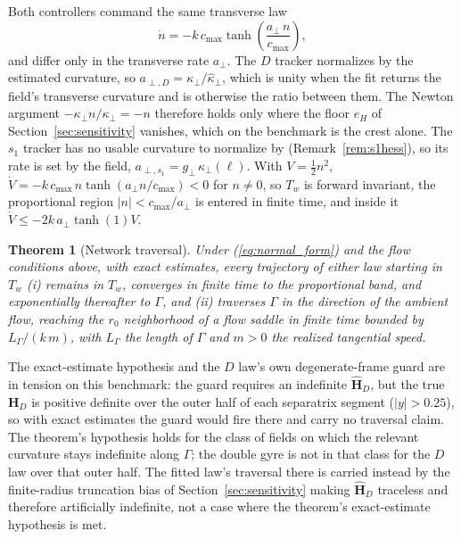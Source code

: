 \documentclass[lettersize,journal]{IEEEtran}
\newtheorem{theorem}{Theorem}
\begin{document}
Both controllers command the same transverse law
\begin{equation}
    \dot{n} = -k\,c_{\max}\tanh\!\left(
        \frac{a_\perp\,n}{c_{\max}}\right),
    \label{eq:n_dynamics}
\end{equation}
and differ only in the transverse rate $a_\perp$. The $D$ tracker
normalizes by the estimated curvature, so $a_{\perp,D} = \kappa_\perp /
\hat{\kappa}_\perp$, which is unity when the fit returns the field's
transverse curvature and is otherwise the ratio between them. The
Newton argument $-\kappa_\perp n/\kappa_\perp = -n$ therefore holds only
where the floor $e_H$ of Section~\ref{sec:sensitivity} vanishes, which on
the benchmark is the crest alone. The $s_1$ tracker has no usable curvature to normalize by
(Remark~\ref{rem:s1hess}), so its rate is set by the field,
$a_{\perp,s_1} = g_\perp\,\kappa_\perp(\ell)$.
With $V = \tfrac{1}{2}n^2$, $\dot{V} = -k\,c_{\max}\,n\tanh(a_\perp
n/c_{\max}) < 0$ for $n \neq 0$, so $T_w$ is forward invariant, the
proportional region $|n| < c_{\max}/a_\perp$ is entered in finite time,
and inside it $\dot{V} \leq -2k\,a_\perp\tanh(1)V$.

\begin{theorem}[Network traversal]
\label{thm:separatrix}
Under (\ref{eq:normal_form}) and the flow conditions above, with exact
estimates, every
trajectory of either law starting in $T_w$ (i) remains in $T_w$, converges
in finite time to the proportional band, and exponentially thereafter to $\Gamma$, and (ii) traverses $\Gamma$ in the direction
of the ambient flow, reaching the $r_0$ neighborhood of a flow saddle in
finite time bounded by $L_\Gamma/(k\,m)$, with $L_\Gamma$ the length of
$\Gamma$ and $m > 0$ the realized tangential speed.
\end{theorem}

The exact-estimate hypothesis and the $D$ law's own degenerate-frame guard
are in tension on this benchmark: the guard requires an indefinite
$\hat{\mathbf{H}}_D$, but the true $\mathbf{H}_D$ is positive definite over
the outer half of each separatrix segment ($|y| > 0.25$), so with exact
estimates the guard would fire there and carry no traversal claim. The
theorem's hypothesis holds for the class of fields on which the relevant
curvature stays indefinite along $\Gamma$; the double gyre is not in that
class for the $D$ law over that outer half. The fitted law's traversal
there is carried instead by the finite-radius
truncation bias of Section~\ref{sec:sensitivity} making $\hat{\mathbf{H}}_D$
traceless and therefore artificially indefinite, not a case where the
theorem's exact-estimate hypothesis is met.
\end{document}
